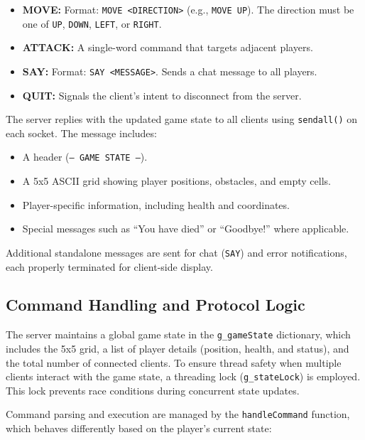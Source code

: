 \documentclass{article}
\begin{document}
\begin{itemize}
    \item \textbf{MOVE:} Format: \texttt{MOVE <DIRECTION>} (e.g., \texttt{MOVE UP}). The direction must be one of \texttt{UP}, \texttt{DOWN}, \texttt{LEFT}, or \texttt{RIGHT}.
    \item \textbf{ATTACK:} A single-word command that targets adjacent players.
    \item \textbf{SAY:} Format: \texttt{SAY <MESSAGE>}. Sends a chat message to all players.
    \item \textbf{QUIT:} Signals the client’s intent to disconnect from the server.
\end{itemize}

The server replies with the updated game state to all clients using \texttt{sendall()} on each socket. The message includes:

\begin{itemize}
    \item A header (\texttt{--- GAME STATE ---}).
    \item A 5x5 ASCII grid showing player positions, obstacles, and empty cells.
    \item Player-specific information, including health and coordinates.
    \item Special messages such as ``You have died'' or ``Goodbye!'' where applicable.
\end{itemize}

Additional standalone messages are sent for chat (\texttt{SAY}) and error notifications, each properly terminated for client-side display.

\subsection{Command Handling and Protocol Logic}

The server maintains a global game state in the \texttt{g\_gameState} dictionary, which includes the 5x5 grid, a list of player details (position, health, and status), and the total number of connected clients. To ensure thread safety when multiple clients interact with the game state, a threading lock (\texttt{g\_stateLock}) is employed. This lock prevents race conditions during concurrent state updates.

Command parsing and execution are managed by the \texttt{handleCommand} function, which behaves differently based on the player's current state:
\end{document}
